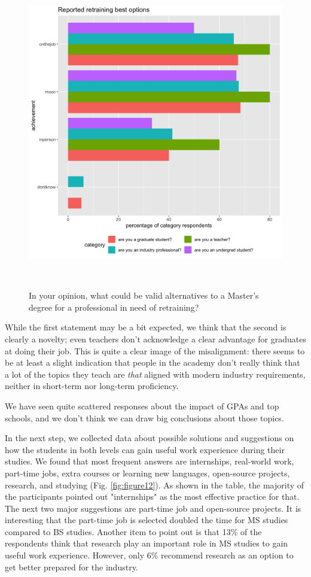 \documentclass{sigchi}
\begin{document}
\begin{figure}
  \includegraphics[scale=0.2]{../data-analysis/plots_output/Reported_retraining_best_options.png}
  \caption{In your opinion, what could be valid alternatives to a Master's degree for a professional in need of retraining?}~\label{fig:figure13}
\end{figure}

While the first statement may be a bit expected, we think that the second is clearly a novelty; even teachers don't acknowledge a clear advantage for graduates at doing their job. This is quite a clear image of the misalignment: there seems to be at least a slight indication that people in the academy don't really think that a lot of the topics they teach are \textit{that} aligned with modern industry requirements, neither in short-term nor long-term proficiency.

We have seen quite scattered responses about the impact of GPAs and top schools, and we don't think we can draw big conclusions about those topics.

In the next step, we collected data about possible solutions and suggestions on how the students in both levels can gain useful work experience during their studies. We found that most frequent answers are internships, real-world work, part-time jobs, extra courses or learning new languages, open-source projects, research, and studying (Fig. \ref{fig:figure12}). As shown in the table, the majority of the participants pointed out "internships" as the most effective practice for that. The next two major suggestions are part-time job and open-source projects. It is interesting that the part-time job is selected doubled the time for MS studies compared to BS studies. Another item to point out is that 13\% of the respondents think that research play an important role in MS studies to gain useful work experience. However, only 6\% recommend research as an option to get better prepared for the industry.
\end{document}

